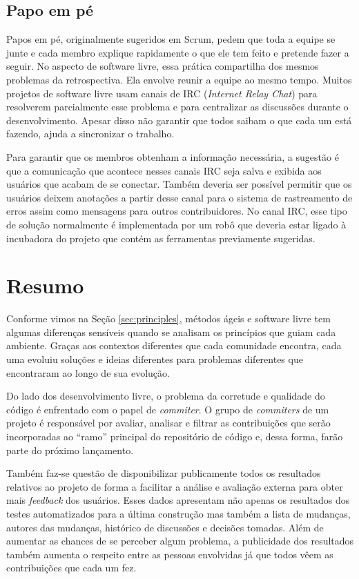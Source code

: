 \subsection{Papo em pé}
\label{subsec:stand-up}

Papos em pé, originalmente sugeridos em Scrum, pedem que toda a equipe
se junte e cada membro explique rapidamente o que ele tem feito e
pretende fazer a seguir. No aspecto de software livre, essa prática
compartilha dos mesmos problemas da retrospectiva. Ela envolve reunir
a equipe ao mesmo tempo. Muitos projetos de software livre usam canais
de IRC (\emph{Internet Relay Chat}) para resolverem parcialmente esse
problema e para centralizar as discussões durante o
desenvolvimento. Apesar disso não garantir que todos saibam o que cada
um está fazendo, ajuda a sincronizar o trabalho.

Para garantir que os membros obtenham a informação necessária, a
sugestão é que a comunicação que acontece nesses canais IRC seja salva
e exibida aos usuários que acabam de se conectar. Também deveria ser
possível permitir que os usuários deixem anotações a partir desse
canal para o sistema de rastreamento de erros assim como mensagens
para outros contribuidores. No canal IRC, esse tipo de solução
normalmente é implementada por um robô que deveria estar ligado à
incubadora do projeto que contém as ferramentas previamente sugeridas.

\section{Resumo}
\label{sec:resumo-diffs}

Conforme vimos na Seção \ref{sec:principles}, métodos ágeis e software
livre tem algumas diferenças sensíveis quando se analisam os
princípios que guiam cada ambiente. Graças aos contextos diferentes
que cada comunidade encontra, cada uma evoluiu soluções e ideias
diferentes para problemas diferentes que encontraram ao longo de sua
evolução.

Do lado dos desenvolvimento livre, o problema da corretude e qualidade
do código é enfrentado com o papel de \emph{commiter}. O grupo de
\emph{commiters} de um projeto é responsável por avaliar, analisar e
filtrar as contribuições que serão incorporadas ao ``ramo'' principal
do repositório de código e, dessa forma, farão parte do próximo
lançamento.

Também faz-se questão de disponibilizar publicamente todos os
resultados relativos ao projeto de forma a facilitar a análise e
avaliação externa para obter mais \textit{feedback} dos
usuários. Esses dados apresentam não apenas os resultados dos testes
automatizados para a última construção mas também a lista de mudanças,
autores das mudanças, histórico de discussões e decisões tomadas. Além
de aumentar as chances de se perceber algum problema, a
publicidade dos resultados também aumenta o respeito entre as pessoas
envolvidas já que todos vêem as contribuições que cada um fez.

